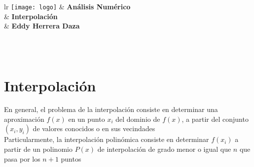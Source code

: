 \documentclass[12pt,letterpaper]{exam}
\newcommand{\uni}{Análisis Numérico}
\newcommand{\fac}{Interpolación}
\newcommand{\dep}{Eddy Herrera Daza}
\begin{document}
\begin{tabular}{lr}
     {\texttt{[image: logo]}}
    	& \hspace{1.5 cm} {\textbf{\uni}} \\	
    	& {\textbf{\fac}} \\
   	& {\textbf{\dep}} 
\end{tabular}\\\\

%


\section{Interpolación}
En general, el problema de la interpolación consiste en determinar una aproximación $f(x)$ en un punto $x_{i}$ del dominio de $f(x)$, a partir del conjunto  ${(x_{i},y_{i})}$ de valores conocidos o en sus vecindades\\
Particularmente, la interpolación polinómica consiste en determinar $f(x_{i})$ a partir de un polinomio $P(x)$ de interpolación de grado menor o igual que $n$ que pasa por los $n+1$ puntos
\end{document}
